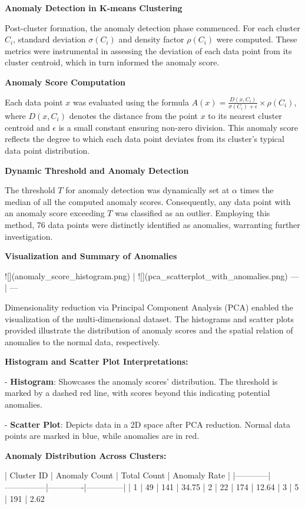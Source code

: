 \documentclass{sigkddExp}
\begin{document}
\textbf{Anomaly Detection in K-means Clustering}

Post-cluster formation, the anomaly detection phase commenced. For each cluster \( C_i \), standard deviation \( \sigma(C_i) \) and density factor \( \rho(C_i) \) were computed. These metrics were instrumental in assessing the deviation of each data point from its cluster centroid, which in turn informed the anomaly score.

\textbf{Anomaly Score Computation}

Each data point \( x \) was evaluated using the formula \( A(x) = \frac{D(x, C_i)}{\sigma(C_i) + \epsilon} \times \rho(C_i) \), where \( D(x, C_i) \) denotes the distance from the point \( x \) to its nearest cluster centroid and \( \epsilon \) is a small constant ensuring non-zero division. This anomaly score reflects the degree to which each data point deviates from its cluster's typical data point distribution.

\textbf{Dynamic Threshold and Anomaly Detection}

The threshold \( T \) for anomaly detection was dynamically set at \( \alpha \) times the median of all the computed anomaly scores. Consequently, any data point with an anomaly score exceeding \( T \) was classified as an outlier. Employing this method, 76 data points were distinctly identified as anomalies, warranting further investigation.

\textbf{Visualization and Summary of Anomalies}

![](anomaly_score_histogram.png) | ![](pca_scatterplot_with_anomalies.png)
--- | --- 


Dimensionality reduction via Principal Component Analysis (PCA) enabled the visualization of the multi-dimensional dataset. The histograms and scatter plots provided illustrate the distribution of anomaly scores and the spatial relation of anomalies to the normal data, respectively.

\textbf{Histogram and Scatter Plot Interpretations:}

- \textbf{Histogram}: Showcases the anomaly scores' distribution. The threshold is marked by a dashed red line, with scores beyond this indicating potential anomalies.
  
- \textbf{Scatter Plot}: Depicts data in a 2D space after PCA reduction. Normal data points are marked in blue, while anomalies are in red.

\textbf{Anomaly Distribution Across Clusters:}

| Cluster ID | Anomaly Count | Total Count | Anomaly Rate |
|------------|---------------|-------------|--------------|
| 1          | 49            | 141         | 34.75%
| 2          | 22            | 174         | 12.64%
| 3          | 5             | 191         | 2.62%
\end{document}
